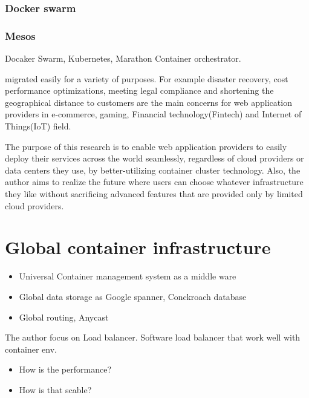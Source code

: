\subsubsection{Docker swarm}
\subsubsection{Mesos}

Docaker Swarm, Kubernetes, Marathon
Container orchestrator.



migrated easily for a variety of purposes.
For example disaster recovery, cost performance optimizations, meeting legal compliance and shortening the geographical distance to customers are the main concerns for web application providers in e-commerce, gaming, Financial technology(Fintech) and Internet of Things(IoT) field.

The purpose of this research is to enable web application providers to easily deploy their services across the world seamlessly, regardless of cloud providers or data centers they use, by better-utilizing container cluster technology. 
Also, the author aims to realize the future where users can choose whatever infrastructure they like without sacrificing advanced features that are provided only by limited cloud providers.


\section{Global container infrastructure}

\begin{itemize}
\item Universal Container management system as a middle ware
\item Global data storage as Google spanner, Conckroach database
\item Global routing, Anycast 
\end{itemize}

The author focus on Load balancer.
Software load balancer that work well with container env.

\begin{itemize}
\item How is the performance?
\item How is that scable?
\end{itemize}

